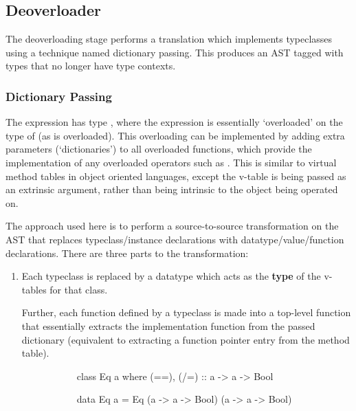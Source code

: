 \documentclass[dissertation.tex]{subfiles}
\begin{document}
{{    }
    \subsection{Deoverloader}\label{sec:deoverloading}
    {

        The deoverloading stage performs a translation which implements typeclasses using a technique named dictionary
        passing. This produces an AST tagged with types that no longer have type contexts.

        \subsubsection{Dictionary Passing}
        {

            The expression  has type , where the expression is essentially
            `overloaded' on the type of  (as \haskell{(+)} is overloaded). This overloading can be
            implemented by adding extra parameters (`dictionaries') to all overloaded functions, which provide the
            implementation of any overloaded operators such as \haskell{(+)}. This is similar to virtual method tables
            in object oriented languages, except the v-table is being passed as an extrinsic argument, rather than being
            intrinsic to the object being operated on.

            The approach used here is to perform a source-to-source transformation on the AST that replaces
            typeclass/instance declarations with datatype/value/function declarations. There are three parts to the
            transformation:
            
            \begin{enumerate}
            \item
            {

                Each typeclass is replaced by a datatype which acts as the \textbf{type} of the v-tables for that class.

                Further, each function defined by a typeclass is made into a top-level function that essentially
                extracts the implementation function from the passed dictionary (equivalent to extracting a function
                pointer entry from the method table).

                \begin{figure}[H]
                \centering
                \begin{subfigure}[t]{0.35\textwidth}
                \begin{haskellfigure}
                class Eq a where
                    (==), (/=) :: a -> a -> Bool
                \end{haskellfigure}
                \end{subfigure}
                \hspace{5mm}
                \begin{subfigure}[t]{0.55\textwidth}
                \begin{haskellfigure}
                data Eq a = Eq (a -> a -> Bool) (a -> a -> Bool)


\end{haskellfigure}
\end{subfigure}
\end{figure}}
\end{enumerate}}}}
\end{document}
